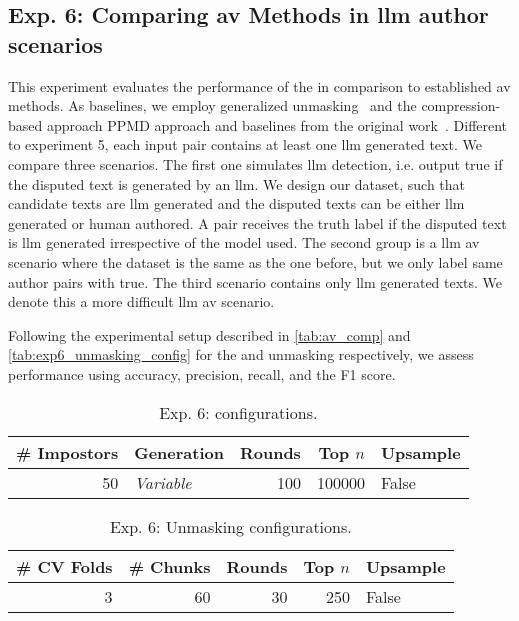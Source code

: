 \subsection{Exp. 6: Comparing \ac{av} Methods in \acs{llm} author scenarios}

This experiment evaluates the performance of the \impAppr{} in comparison to established \ac{av} methods.
As baselines, we employ generalized unmasking~\citep{bevendorff_generalizing_2019} and the compression-based approach PPMD approach and baselines from the original work~\citep{koppel_determining_2014}.
Different to experiment 5, each input pair contains at least one \ac{llm} generated text.
We compare three scenarios.
The first one simulates \ac{llm} detection, i.e. output true if the disputed text is generated by an \ac{llm}.
We design our dataset, such that candidate texts are \ac{llm} generated and the disputed texts can be either \ac{llm} generated or human authored.
A pair receives the truth label if the disputed text is \ac{llm} generated irrespective of the model used.
The second group is a \ac{llm} \ac{av} scenario where the dataset is the same as the one before, but we only label same author pairs with true.
The third scenario contains only \ac{llm} generated texts.
We denote this a more difficult \ac{llm} \ac{av} scenario.


Following the experimental setup described in \autoref{tab:av_comp} and \autoref{tab:exp6_unmasking_config} for the \impAppr{} and unmasking respectively, we assess performance using  accuracy, precision, recall, and the F1 score. 

\begin{table}[h]
\centering\small
\caption{Exp. 6: \impAppr{} configurations.}
\label{tab:av_comp}
\begin{tabular}{@{}rlrrl@{}}   %
\toprule
\# Impostors & Generation & Rounds & Top $n$ & Upsample \\
\midrule
50 & \textit{Variable} & 100 & \num{100000} & False \\
\bottomrule
\end{tabular}%
\end{table}

\begin{table}[h]
\centering\small
\caption{Exp. 6: Unmasking configurations.}
\label{tab:exp6_unmasking_config}
\begin{tabular}{@{}rrrrl@{}}   %
\toprule
\# CV Folds & \# Chunks & Rounds & Top $n$ & Upsample \\
\midrule
3 & 60 & 30 & \num{250} & False \\
\bottomrule
\end{tabular}%
\end{table}